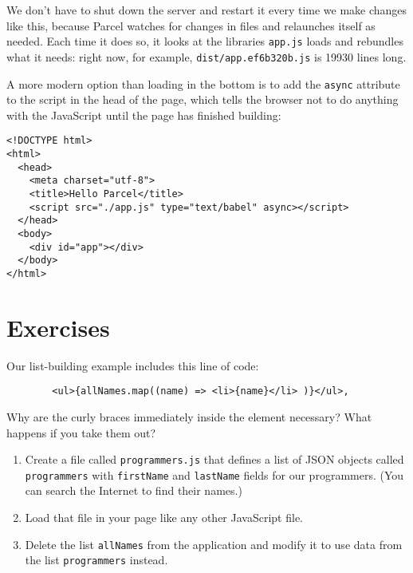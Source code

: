 We don't have to shut down the server and restart it every time we make changes like this,
because Parcel watches for changes in files and relaunches itself as needed.
Each time it does so,
it looks at the libraries \texttt{app.js} loads and rebundles what it needs:
right now,
for example,
\texttt{dist/app.ef6b320b.js} is 19930 lines long.

A more modern option than loading in the bottom is
to add the \texttt{async} attribute
to the script in the head of the page,
which tells the browser not to do anything with the JavaScript until the page has finished building:

\begin{verbatim}
<!DOCTYPE html>
<html>
  <head>
    <meta charset="utf-8">
    <title>Hello Parcel</title>
    <script src="./app.js" type="text/babel" async></script>
  </head>
  <body>
    <div id="app"></div>
  </body>
</html>
\end{verbatim}

\section{Exercises}\label{s:dynamic-exercises}


Our list-building example includes this line of code:

\begin{verbatim}
        <ul>{allNames.map((name) => <li>{name}</li> )}</ul>,
\end{verbatim}

Why are the curly braces immediately inside the \texttt{} element necessary?
What happens if you take them out?


\begin{enumerate}
\item
  Create a file called \texttt{programmers.js} that defines
  a list of JSON objects called \texttt{programmers}
  with \texttt{firstName} and \texttt{lastName} fields for our programmers.
  (You can search the Internet to find their names.)
\item
  Load that file in your page like any other JavaScript file.
\item
  Delete the list \texttt{allNames} from the application
  and modify it to use data from the list \texttt{programmers} instead.
\end{enumerate}


